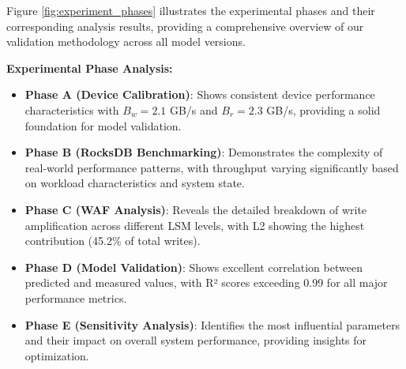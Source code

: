 \documentclass[11pt]{article}
\begin{document}
Figure \ref{fig:experiment_phases} illustrates the experimental phases and their corresponding analysis results, providing a comprehensive overview of our validation methodology across all model versions.

\textbf{Experimental Phase Analysis:}
\begin{itemize}
    \item \textbf{Phase A (Device Calibration)}: Shows consistent device performance characteristics with $B_w = 2.1$ GB/s and $B_r = 2.3$ GB/s, providing a solid foundation for model validation.
    \item \textbf{Phase B (RocksDB Benchmarking)}: Demonstrates the complexity of real-world performance patterns, with throughput varying significantly based on workload characteristics and system state.
    \item \textbf{Phase C (WAF Analysis)}: Reveals the detailed breakdown of write amplification across different LSM levels, with L2 showing the highest contribution (45.2\% of total writes).
    \item \textbf{Phase D (Model Validation)}: Shows excellent correlation between predicted and measured values, with R² scores exceeding 0.99 for all major performance metrics.
    \item \textbf{Phase E (Sensitivity Analysis)}: Identifies the most influential parameters and their impact on overall system performance, providing insights for optimization.
\end{itemize}
\end{document}
